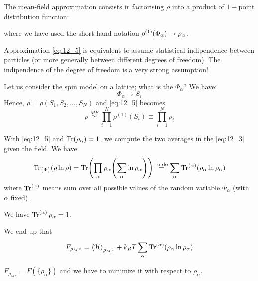 \documentclass[../main/main.tex]{subfiles}
\begin{document}
The mean-field approximation consists in factorising \( \rho  \) into a product of \( 1- \)point distribution function:
where we have used the short-hand notation \(  \rho^{(1)}\qty(\Phi _ \alpha ) \rightarrow  \rho _ \alpha \).
\begin{remark}
Approximation \eqref{eq:12_5} is equivalent to assume statistical indipendence between particles (or more generally between different degrees of freedom). The indipendence of the degree of freedom is a very strong assumption!
\end{remark}
\begin{example}
Let us consider the spin model on a lattice; what is the \( \Phi _ \alpha  \)? We have:
\begin{equation*}
   \Phi _ \alpha  \rightarrow S_i
\end{equation*}
Hence, \( \rho = \rho (S_1,S_2, \dots, S_N) \) and \eqref{eq:12_5} becomes
\begin{equation}
  \rho \overset{MF}{\simeq } \prod_{i =1}^{N} \rho ^{(1)} (S_i) \equiv \prod_{i =1}^{N} \rho_ i
\end{equation}
\end{example}
With \eqref{eq:12_5} and \( \Tr(\rho _ \alpha ) =1 \), we compute the two averages in the \eqref{eq:12_3} given the field. We have:
\begin{equation}
  \Tr_{\{ \Phi  \}  } ( \rho \ln{\rho } ) = \Tr(\prod_{\alpha }^{} \rho _ \alpha  \qty( \sum_{\alpha }^{} \ln{\rho _ \alpha }  ) ) \overset{\text{to do}}{=} \sum_{\alpha }^{}
  \Tr^{(\alpha )}(\rho _ \alpha  \ln{\rho _ \alpha } )
\end{equation}
where \( \Tr^{(\alpha )} \) means sum over all possible values of the random variable \( \Phi _ \alpha  \) (with \( \alpha  \) fixed).
\begin{remark}
We have \( \Tr^{(\alpha )} \rho _ \alpha = 1 \).
\end{remark}
We end up that
\begin{equation}
  F_{\rho _{MF}} = \expval{\mathcal{H}}_{\rho _{MF}} + k_B T \sum_{\alpha }^{} \Tr^{(\alpha )}(\rho _ \alpha  \ln{\rho _ \alpha } )
\end{equation}
\begin{remark}
\( F_{\rho _{MF}} = F ( \{ \rho _ \alpha  \}  ) \)  and we have to minimize it with respect to \( \rho _ \alpha  \).
\end{remark}
\end{document}

